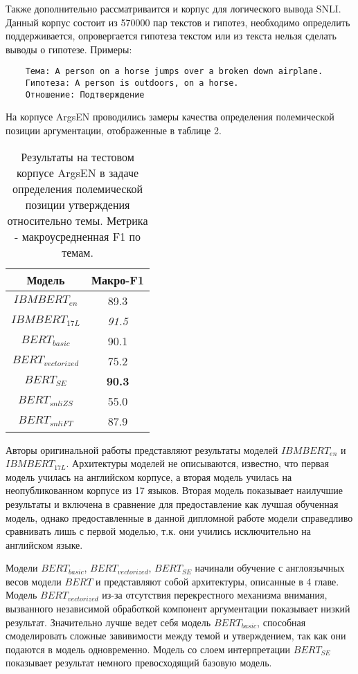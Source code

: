 Также дополнительно рассматриваится и корпус для логического вывода SNLI. Данный корпус состоит из 570000 пар текстов и гипотез, необходимо определить поддерживается, опровергается гипотеза текстом или из текста нельзя сделать выводы о гипотезе. Примеры:

\begin{verbatim}
    Тема: A person on a horse jumps over a broken down airplane.
    Гипотеза: A person is outdoors, on a horse.
    Отношение: Подтверждение
\end{verbatim}

На корпусе ArgsEN проводились замеры качества определения полемической позиции аргументации, отображенные в таблице 2.


\begin{table}[h!]
\centering
\begin{tabular}{|| c | c |} 
 \hline
 Модель & Макро-F1 \\ [0.5ex] 
 \hline
 $IBM BERT_{en}$ & 89.3 \\
 $IBM BERT_{17L}$ & \textit{91.5} \\
 $BERT_{basic}$ & 90.1 \\
 $BERT_{vectorized}$ & 75.2 \\
 $BERT_{SE}$ & \textbf{90.3} \\
 $BERT_{snliZS}$ & 55.0 \\
 $BERT_{snliFT}$ & 87.9 \\
 \hline
\end{tabular}
\caption{Результаты на тестовом корпусе ArgsEN в задаче определения полемической позиции утверждения относительно темы. Метрика - макроусредненная F1 по темам.}
\label{table:1}
\end{table}

Авторы оригинальной работы представляют результаты моделей $IBM BERT_{en}$ и $IBM BERT_{17L}$. Архитектуры моделей не описываются, известно, что первая модель училась на английском корпусе, а вторая модель училась на неопубликованном корпусе из 17 языков. Вторая модель показывает наилучшие результаты и включена в сравнение для предоставление как лучшая обученная модель, однако предоставленные в данной дипломной работе модели справедливо сравнивать лишь с первой моделью, т.к. они учились исключительно на английском языке. 

Модели $BERT_{basic}$, $BERT_{vectorized}$, $BERT_{SE}$ начинали обучение с англоязычных весов модели $BERT$ и представляют собой архитектуры, описанные в 4 главе. Модель $BERT_{vectorized}$ из-за отсутствия перекрестного механизма внимания, вызванного независимой обработкой компонент аргументации показывает низкий результат. Значительно лучше ведет себя модель $BERT_{basic}$, способная смоделировать сложные завивимости между темой и утверждением, так как они подаются в модель одновременно. Модель со слоем интерпретации $BERT_{SE}$ показывает результат немного превосходящий базовую модель.


